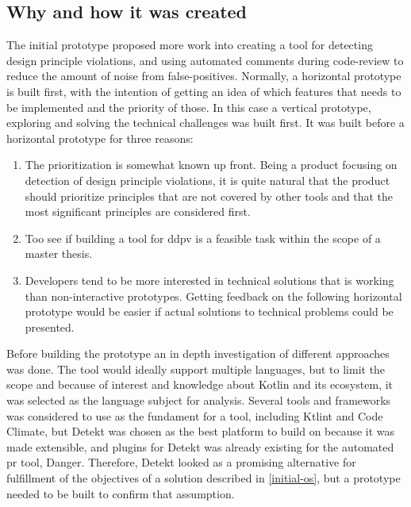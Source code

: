 \documentclass[pdftex,10pt,b5paper,twoside]{report}
\begin{document}
\subsection*{Why and how it was created}
The initial prototype proposed more work into creating a tool for detecting design principle violations, and using automated comments during code-review to reduce the amount of noise from false-positives. Normally, a horizontal prototype is built first, with the intention of getting an idea of which features that needs to be implemented and the priority of those. In this case a vertical prototype, exploring and solving the technical challenges was built first. It was built before a horizontal prototype for three reasons:

\begin{enumerate}
    \item The prioritization is somewhat known up front. Being a product focusing on detection of design principle violations, it is quite natural that the product should prioritize principles that are not covered by other tools and that the most significant principles are considered first.
    \item Too see if building a tool for \gls{ddpv} is a feasible task within the scope of a master thesis.
    \item Developers tend to be more interested in technical solutions that is working than non-interactive prototypes. Getting feedback on the following horizontal prototype would be easier if actual solutions to technical problems could be presented.
\end{enumerate}

Before building the prototype an in depth investigation of different approaches was done. The tool would ideally support multiple languages, but to limit the scope and because of interest and knowledge about Kotlin and its ecosystem, it was selected as the language subject for analysis. Several tools and frameworks was considered to use as the fundament for a tool, including Ktlint\cite{ktlint} and Code Climate\cite{codeclimate}, but Detekt\cite{detekt} was chosen as the best platform to build on because it was made extensible, and plugins for Detekt was already existing for the automated \gls{pr} tool\cite{danger-detekt-plugin}, Danger\cite{danger}. Therefore, Detekt looked as a promising alternative for fulfillment of the objectives of a solution described in \ref{initial-os}, but a prototype needed to be built to confirm that assumption. 
\end{document}
